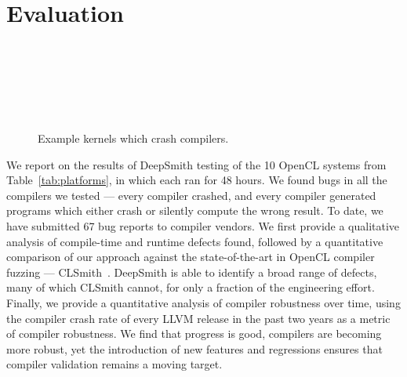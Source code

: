 \section{Evaluation}%
\label{sec:eval}



\begin{figure}
  \centering %
  \\%
  \\%
  \\%
  \\%
  \\%
  \caption{Example kernels which crash compilers.}%
  \vspace{-1.1em}
\end{figure}

\noindent
We report on the results of DeepSmith testing of the 10 OpenCL systems from
Table~\ref{tab:platforms}, in which each ran for 48 hours. We found bugs in all
the compilers we tested --- every compiler crashed, and every compiler generated
programs which either crash or silently compute the wrong result. To date, we
have submitted 67 bug reports to compiler vendors. We first provide a
qualitative analysis of compile-time and runtime defects found, followed by a
quantitative comparison of our approach against the state-of-the-art in OpenCL
compiler fuzzing --- CLSmith~\cite{Lidbury2015a}. DeepSmith is able to identify
a broad range of defects, many of which CLSmith cannot, for only a fraction of
the engineering effort. Finally, we provide a quantitative analysis of compiler
robustness over time, using the compiler crash rate of every LLVM release in the
past two years as a metric of compiler robustness. We find that progress is
good, compilers are becoming more robust, yet the introduction of new features
and regressions ensures that compiler validation remains a moving target.

